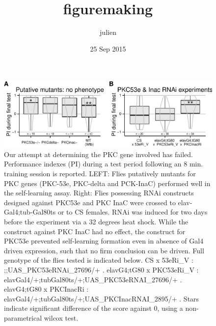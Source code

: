 \documentclass[]{article}
\title{figuremaking}
\author{julien}
\date{25 Sep 2015}
\begin{document}
\maketitle


\begin{figure}[htbp]
\centering
\includegraphics{firsttest_files/figure-latex/unnamed-chunk-2-1.pdf}
\caption{\label{fig:PKC} Our attempt at determining the PKC gene
involved has failed. Performance indexes (PI) during a test period
following an 8 min. training session is reported. LEFT: Flies putatively
mutants for PKC genes (PKC-53e, PKC-delta and PCK-InaC) performed well
in the self-learning assay. Right: Flies possessing RNAi constructs
designed against PKC53e and PKC InaC were crossed to
elav-Gal4;tub-Gal80ts or to CS females. RNAi was induced for two days
before the experiment via a 32 degrees heat shock. While the construct
against PKC InaC had no effect, the construct for PKC53e prevented
self-learning formation even in absence of Gal4 driven expression, such
that no firm conclusion can be driven. Full genotype of the flies tested
is indicated below. CS x 53eRi\_V : ;;UAS\_PKC53eRNAi\_27696/+ .
elavG4;tG80 x PKC53eRi\_V :
elavGal4/+;tubGal80ts/+;UAS\_PKC53eRNAI\_27696/+ . elavG4;tG80 x
PKCInacRi : elavGal4/+;tubGal80ts/+;UAS\_PKCInacRNAI\_2895/+ . Stars
indicate significant difference of the score against 0, using a
non-parametrical wilcox test.}
\end{figure}
\end{document}

